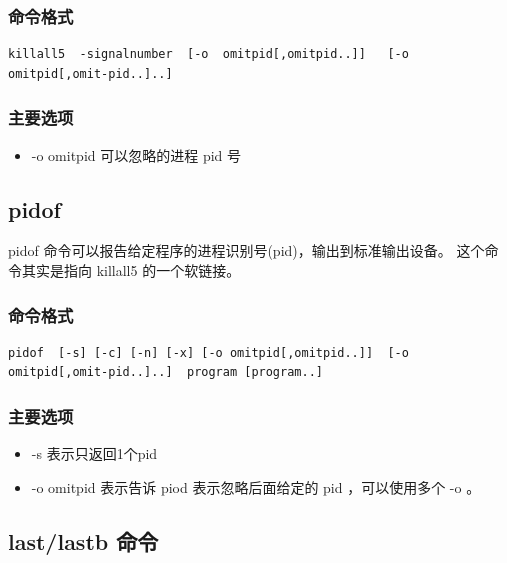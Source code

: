 \subsubsection{命令格式}

{\begin{shaded}\begin{verbatim}
killall5  -signalnumber  [-o  omitpid[,omitpid..]]   [-o omitpid[,omit‐pid..]..]
\end{verbatim}\end{shaded}}
\subsubsection{主要选项}

\begin{itemize}
\item
  -o omitpid 可以忽略的进程 pid 号
\end{itemize}
\subsection{pidof}

pidof 命令可以报告给定程序的进程识别号(pid)，输出到标准输出设备。
这个命令其实是指向 killall5 的一个软链接。

\subsubsection{命令格式}

{\begin{shaded}\begin{verbatim}
pidof  [-s] [-c] [-n] [-x] [-o omitpid[,omitpid..]]  [-o omitpid[,omit‐pid..]..]  program [program..]
\end{verbatim}\end{shaded}}
\subsubsection{主要选项}

\begin{itemize}
\item
  -s 表示只返回1个pid
\item
  -o omitpid 表示告诉 piod 表示忽略后面给定的 pid ，可以使用多个 -o 。
\end{itemize}
\subsection{last/lastb 命令}


